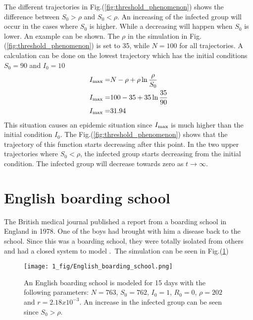 \documentclass[%
twoside,                 %
final,                   %
chapterprefix=true,      %
open=right               %
10pt]{book}
\begin{document}
The different trajectories in Fig.(\ref{fig:threshold_phenomenon}) shows the difference between $S_0 > \rho$ and $S_0 < \rho$. An increasing of the infected group will occur in the cases where $S_0$ is higher. While a decreasing will happen when $S_0$ is lower. An example can be shown. The $\rho$ in the simulation in Fig.(\ref{fig:threshold_phenomenon}) is set to 35, while $N=100$ for all trajectories. A calculation can be done on the lowest trajectory which has the initial conditions $S_0= 90$ and $I_0= 10$
\begin{align*}
I_{\textrm{max}} =& N-\rho + \rho \ln \frac{\rho}{S_0}\\
I_{\textrm{max}} =& 100-35 + 35 \ln \frac{35}{90}\\
I_{\textrm{max}} =& 31.94
\end{align*}
This situation causes an epidemic situation since $I_{\textrm{max}}$ is much higher than the initial condition $I_0$. The Fig.(\ref{fig:threshold_phenomenon}) shows that the trajectory of this function starts decreasing after this point. In the two upper trajectories where $S_0 < \rho$, the infected group starts decreasing from the initial condition. The infected group will decrease towards zero as $t\rightarrow \infty$.

\section{English boarding school}
\label{section:1_english}
The British medical journal published a report from a boarding school in England in 1978. One of the boys had brought with him a disease back to the school. Since this was a boarding school, they were totally isolated from others and had a closed system to model \cite[p.~325]{murray2002mathematical}.~The simulation can be seen in Fig.(\ref{fig:english_boarding})  


\begin{figure}[ht]
  \centerline{\texttt{[image: 1\_fig/English\_boarding\_school.png]}}
  \caption{
  \label{fig:english_boarding} An English boarding school is modeled for 15 days with the following parameters: $N=763$, $S_0=762$, $I_0=1$, $R_0=0$, $\rho=202$ and $r=2.18 x 10^{-3}$. An increase in the infected group can be seen since $S_0 > \rho$.
  }
\end{figure}
\end{document}
